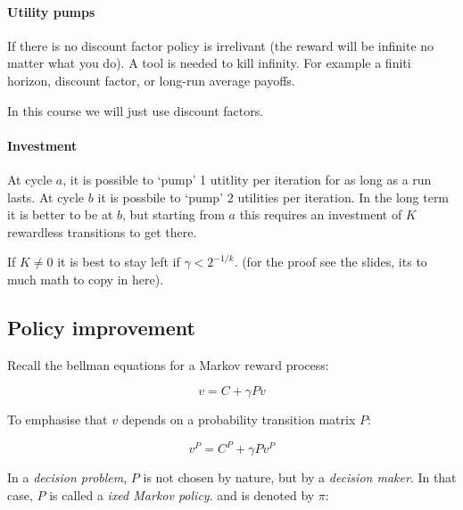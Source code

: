 \documentclass{article}
\begin{document}
\paragraph{Utility pumps}
If there is no discount factor policy is irrelivant (the reward will be
infinite no matter what you do). A tool is needed to kill infinity.
For example a finiti horizon, discount factor, or long-run average
payoffs.

In this course we will just use discount factors.

\paragraph{Investment} 
At cycle $a$, it is possible to `pump' 1 utitlity per iteration for as
long as a run lasts. At cycle $b$ it is possbile to `pump' $2$ utilities
per iteration.
In the long term it is better to be at $b$, but starting from $a$ this
requires an investment of $K$ rewardless transitions to get there.

\begin{center}
\end{center}

If $K \ne 0$ it is best to stay left if $\gamma < 2^{-1/k}$. (for the
proof see the slides, its to much math to copy in here).

\subsection{Policy improvement}

Recall the bellman equations for a Markov reward process:

\[ v = C+\gamma P v\]

To emphasise that $v$ depends on a probability transition matrix $P$:

\[ v^P = C^P + \gamma P v^P\]

In a \emph{decision problem}, $P$ is not chosen by nature, but by a 
\emph{decision maker}. In that case, $P$ is called a \emph{ixed Markov
policy}. and is denoted by $\pi$:
\end{document}
